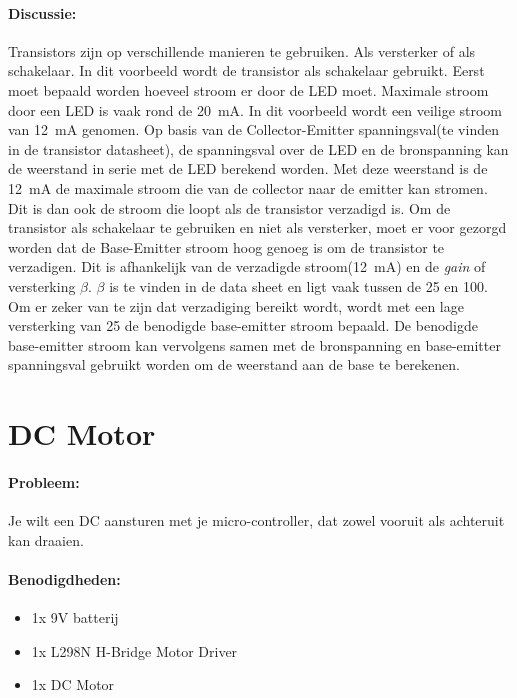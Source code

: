 \paragraph{Discussie:} Transistors zijn op verschillende manieren te gebruiken. Als versterker of als schakelaar. In dit voorbeeld wordt de transistor als schakelaar gebruikt. Eerst moet bepaald worden hoeveel stroom er door de LED moet. Maximale stroom door een LED is vaak rond de \SI{20}{\milli\ampere}. In dit voorbeeld wordt een veilige stroom van \SI{12}{\milli\ampere} genomen. Op basis van de Collector-Emitter spanningsval(te vinden in de transistor datasheet), de spanningsval over de LED en de bronspanning kan de weerstand in serie met de LED berekend worden. Met deze weerstand is de \SI{12}{\milli\ampere} de maximale stroom die van de collector naar de emitter kan stromen. Dit is dan ook de stroom die loopt als de transistor verzadigd is. Om de transistor als schakelaar te gebruiken en niet als versterker, moet er voor gezorgd worden dat de Base-Emitter stroom hoog genoeg is om de transistor te verzadigen. Dit is afhankelijk van de verzadigde stroom(\SI{12}{\milli\ampere}) en de \textit{gain} of versterking $\beta$. $\beta$ is te vinden in de data sheet en ligt vaak tussen de 25 en 100. Om er zeker van te zijn dat verzadiging bereikt wordt, wordt met een lage versterking van 25 de benodigde base-emitter stroom bepaald. De benodigde base-emitter stroom kan vervolgens samen met de bronspanning en base-emitter spanningsval gebruikt worden om de weerstand aan de base te berekenen.

\newpage



\section{DC Motor}\label{sec:DCMotor}
\paragraph{Probleem:}
Je wilt een DC aansturen met je micro-controller, dat zowel vooruit als achteruit kan draaien.

\paragraph{Benodigdheden:}
\begin{itemize}
	\item 1x 9V batterij
	\item 1x L298N H-Bridge Motor Driver
	\item 1x DC Motor
\end{itemize}

